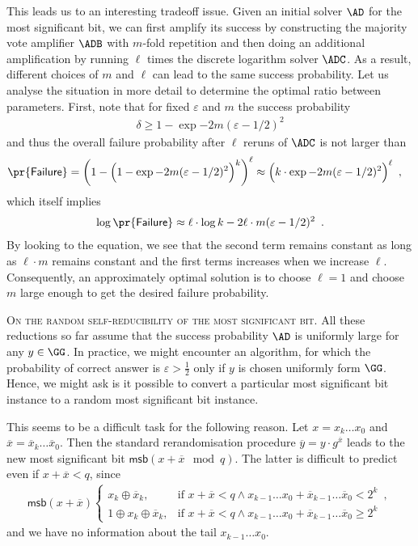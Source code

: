 \documentclass{crypto-exercise}
\newcommand{\msb}{\mathsf{msb}}
\begin{document}
\begin{solution}
This leads us to an interesting tradeoff issue. Given an initial solver $\AD$ for the most significant bit, we can first amplify its success by constructing the majority vote amplifier $\ADB$ with $m$-fold repetition and then doing an additional amplification by running $\ell$ times the discrete logarithm solver $\ADC$.  As a result, different choices of $m$ and $\ell$ can lead to the same success probability. Let us analyse the situation in more detail to determine the optimal ratio between parameters. First, note that for fixed $\varepsilon$ and $m$ the success probability 
\begin{align*}
\delta\geq 1-\exp{-2m (\varepsilon-1/2)^2}
\end{align*}
and thus the overall failure probability after $\ell$ reruns of $\ADC$ is not larger than 
\begin{align*}
\pr{\mathsf{Failure}}=
\biggl(1-\Bigl(1-\exp{-2m (\varepsilon-1/2)^2}\Bigr)^k\biggr)^\ell
&\approx \Bigl(k\cdot \exp{-2m (\varepsilon-1/2)^2}\Bigr)^\ell\enspace,
\end{align*}
which itself implies 
\begin{align*}
\log \pr{\mathsf{Failure}}\approx \ell\cdot \log k -2\ell\cdot m (\varepsilon-1/2)^2\enspace.
\end{align*} 
By looking to the equation, we see that the second term remains constant as long as $\ell\cdot m$ remains constant and the first terms increases when we increase $\ell$. Consequently, an approximately optimal solution is to choose $\ell=1$ and choose $m$ large enough to get the desired failure probability.   

\vspace*{2ex}
\noindent
\textsc{On the random self-reducibility of the most significant bit.}
All these reductions so far assume that the success probability $\AD$ is uniformly large for any $y\in\GG$. In practice, we might encounter an algorithm, for which the probability of correct answer is $\varepsilon>\frac{1}{2}$ only if $y$ is chosen uniformly form $\GG$. Hence, we might ask is it possible to convert a particular most significant bit instance to a random most significant bit instance. 

This seems to be a difficult task for the following reason. Let $x=x_k\ldots x_0$ and $\overline{x}=\overline{x}_k\ldots\overline{x}_0$. Then the standard rerandomisation procedure $\overline{y}=y\cdot g^{\overline{x}}$ leads to the new most significant bit $\msb(x+\overline{x}\mod q)$. The latter is difficult to predict even if $x+\overline{x}<q$,
since
\begin{align*}
\msb(x+\overline{x})
\begin{cases}
x_k\oplus \overline{x}_k,&\text{if } x+\overline{x}< q \wedge x_{k-1}\ldots x_0+ \overline{x}_{k-1}\ldots \overline{x}_0 < 2^k\enspace, \\
1\oplus x_k\oplus \overline{x}_k,&\text{if } x+\overline{x}< q \wedge x_{k-1}\ldots x_0+ \overline{x}_{k-1}\ldots \overline{x}_0 \geq 2^k\enspace
\end{cases}
\end{align*}
and we have no information about the tail $x_{k-1}\ldots x_0$. \end{solution}
\end{document}
